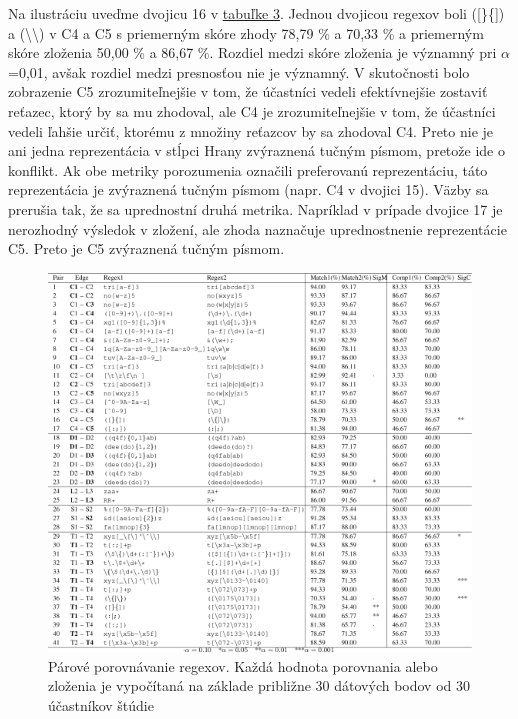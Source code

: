 \documentclass[10pt,twoside,slovak,a4paper]{article}
\begin{document}
Na ilustráciu uveďme dvojicu 16 v \hyperref[fig:table3]{tabuľke 3}. Jednou dvojicou regexov boli ([\}\{]) a (\textbackslash{\textbar\textbackslash}) v C4 a C5 s priemerným skóre zhody 78,79 \% a 70,33 \% a priemerným skóre zloženia 50,00 \% a 86,67 \%. Rozdiel medzi skóre zloženia je významný pri $\alpha$=0,01, avšak rozdiel medzi presnosťou nie je významný. V skutočnosti bolo zobrazenie C5 zrozumiteľnejšie v tom, že účastníci vedeli efektívnejšie zostaviť reťazec, ktorý by sa mu zhodoval, ale C4 je zrozumiteľnejšie v tom, že účastníci vedeli ľahšie určiť, ktorému z množiny reťazcov by sa zhodoval C4. Preto nie je ani jedna reprezentácia v stĺpci Hrany zvýraznená tučným písmom, pretože ide o konflikt. Ak obe metriky porozumenia označili preferovanú reprezentáciu, táto reprezentácia je zvýraznená tučným písmom (napr. C4 v dvojici 15). Väzby sa prerušia tak, že sa uprednostní druhá metrika. Napríklad v prípade dvojice 17 je nerozhodný výsledok v zložení, ale zhoda naznačuje uprednostnenie reprezentácie C5. Preto je C5 zvýraznená tučným písmom.\cite{Chapman2017}
\begin{figure}[h]
	\centering
	\includegraphics[width=1\textwidth]{table3.png}
	\caption{Párové porovnávanie regexov. Každá hodnota porovnania alebo zloženia je vypočítaná na základe približne 30 dátových bodov od 30 účastníkov štúdie \cite{Chapman2017}}
	\label{fig:table3}
  \end{figure}
\\
\end{document}
